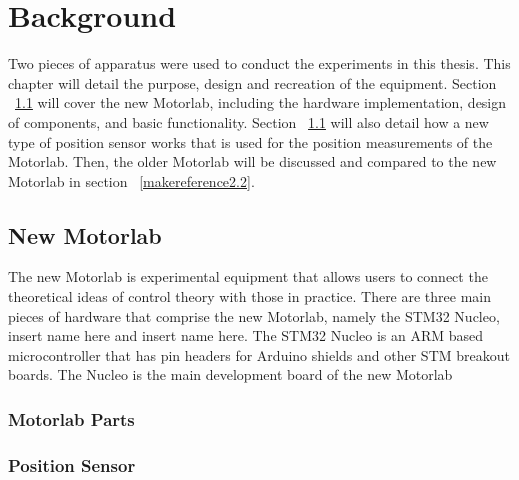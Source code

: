 
\cleardoublepage


\chapter{Background}
\label{makereference2}

Two pieces of apparatus were used to conduct the experiments in this thesis. This chapter will detail the purpose, design and recreation of the equipment. Section ~\ref{makereference2.1} will cover the new Motorlab, including the hardware implementation, design of components, and basic functionality. Section ~\ref{makereference2.1} will also detail how a new type of position sensor works that is used for the position measurements of the Motorlab. Then, the older Motorlab will be discussed and compared to the new Motorlab in section ~\ref{makereference2.2}.

\section{New Motorlab}
\label{makereference2.1} 

The new Motorlab is experimental equipment that allows users to connect the theoretical ideas of control theory with those in practice. There are three main pieces of hardware that comprise the new Motorlab, namely the STM32 Nucleo, insert name here and insert name here. The STM32 Nucleo is an ARM based microcontroller that has pin headers for Arduino shields and other STM breakout boards. The Nucleo is the main development board of the new Motorlab


\subsection{Motorlab Parts}
\label{makereference2.1.1} 

\subsection{Position Sensor}
\label{makereference2.1.2} 

